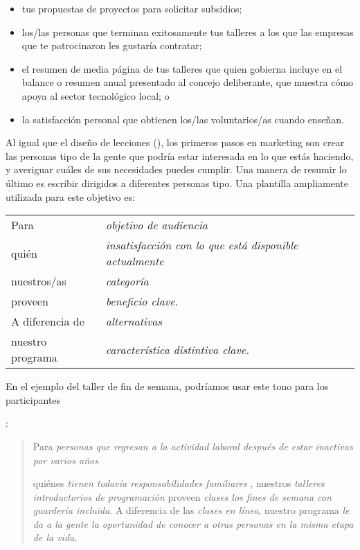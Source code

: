 \begin{itemize}

\item
	tus propuestas de proyectos para solicitar subsidios;

\item
 
	los/las personas que terminan exitosamente tus talleres
	a los que las empresas que te patrocinaron les gustaría contratar;

\item
   el resumen de media página de tus talleres que quien gobierna incluye 
   en el balance o resumen anual presentado al concejo deliberante,  
   que muestra cómo apoya al sector tecnológico local;
o

\item
   la satisfacción personal que obtienen los/las voluntarios/as cuando enseñan.
\end{itemize}

Al igual que el diseño de lecciones (),
los primeros pasos en marketing son crear
las personas tipo 
de la gente que podría estar interesada en lo que estás haciendo, 
y averiguar cuáles de sus necesidades puedes cumplir.
Una manera de resumir lo último es escribir  
dirigidos a diferentes personas tipo.
Una plantilla ampliamente utilizada para este objetivo es:

\begin{longtable}{ll}
  Para        & \emph{ objetivo de audiencia} \\
  quién        & \emph{ insatisfacción con lo que está disponible actualmente} \\
  nuestros/as        & \emph{categoría} \\
  proveen    & \emph{beneficio clave}. \\
  A diferencia de    & \emph{alternativas} \\
  nuestro programa    & \emph{característica distintiva clave.}
\end{longtable}

\noindent
En el ejemplo del taller de fin de semana,
podríamos usar este tono para los participantes

:
\begin{quote}

Para \emph{personas que regresan a la actividad laboral después de estar inactivas por varios años}

quiénes \emph{tienen todavía responsabilidades familiares },
nuestros \emph{talleres introductorios de programación}
proveen \emph{clases los fines de semana con guardería incluida}.
A diferencia de las \emph{clases en línea},
nuestro programa \emph{le da a la gente la oportunidad de conocer a otras personas en la misma etapa de la vida}.

\end{quote}

